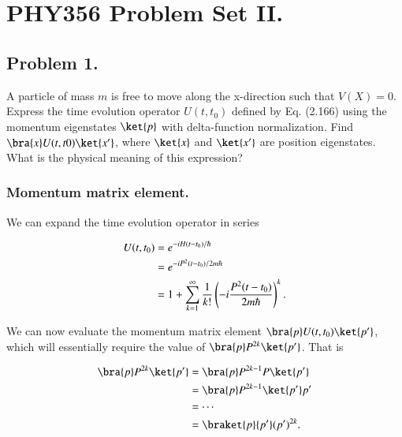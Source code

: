 %
%
%
%
%
%

\chapter{PHY356 Problem Set II.}
\label{chap:qmIproblemSet2}
\date{Oct 23, 2010}

\beginArtNoToc
\section{Problem 1.}

A particle of mass $m$ is free to move along the x-direction such that $V(X)=0$. Express the time evolution operator $U(t,t_0)$ defined by Eq. (2.166) using the momentum eigenstates $\ket{p}$ with delta-function normalization. Find $\bra{x} U(t,t0) \ket{x'}$,  where $\ket{x}$ and $\ket{x'}$ are position eigenstates.  What is the physical meaning of this expression?

\subsection{Momentum matrix element.}

We can expand the time evolution operator in series

\begin{align*}
U(t,t_0) 
&= e^{-i H(t-t_0)/\hbar} \\
&= e^{ -i P^2 (t-t_0)/ 2m \hbar } \\
&= 1 + \sum_{k=1}^\infty \frac{1}{k!} \left( -i \frac{P^2 (t-t_0)}{2m \hbar} \right)^k.
\end{align*}

We can now evaluate the momentum matrix element $\bra{p} U(t,t_0) \ket{p'}$, which will essentially require the value of $\bra{p} P^{2k} \ket{p'}$.  That is

\begin{align*}
\bra{p} P^{2k} \ket{p'}
&= \bra{p} P^{2k-1} P \ket{p'} \\
&= \bra{p} P^{2k-1} \ket{p'} p' \\
&= \cdots \\
&= \braket{p}{p'} (p')^{2k}.
\end{align*}

